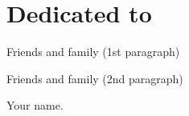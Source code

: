 \chapter*{Dedicated to}

  \begin{dedication}
  
    Friends and family (1st paragraph)
    
    \par   %
    \vspace{1\baselineskip}
    
    Friends and family (2nd paragraph)

    \vspace{\baselineskip}
     Your name.
  \end{dedication}


